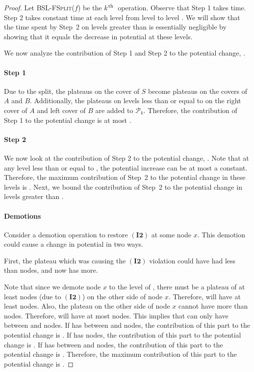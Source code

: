 \documentclass[11pt]{article}
\newcommand{\ens}[1]{\ensuremath{#1}}
\newcommand{\kth}{\ens{k^{ \mbox{\hspace{.2mm}\scriptsize th}}}}
\newcommand{\Bslfsplx}[1]{\mbox{\textsc{BSL-FSplit(\ensuremath{#1})}}}
\newcommand{\invtwo}{\ensuremath{\mathbf{(I2)}}}
\newcommand{\node}[1]{\ensuremath{#1}}
\newcommand{\bsl}[1]{\ensuremath{#1}}
\newcommand{\plats}[1]{\ensuremath{\mathcal P_{#1}}}
\begin{document}
\begin{proof} 
Let \Bslfsplx{f} be the \kth\ operation. Observe that Step 1 takes  time. 
Step 2 takes constant time at each level from level  to level . We will show that the time spent by Step~2 on levels greater than  is essentially negligible by showing that it equals the decrease in potential at these levels. 

We now analyze the contribution of Step 1 and Step 2 to the potential change, . 

\paragraph{Step 1} 


Due to the split, the plateaus on the cover of \bsl S become plateaus on the covers of \bsl A and \bsl B. Additionally, the plateaus on levels less than or equal to  on the right cover of \bsl A and left cover of \bsl B are added to \plats k. 
Therefore, the contribution of Step 1 to the potential change is at most . 

\paragraph{Step 2} 
We now look at the contribution of Step 2 to the potential change, . Note that at any level less than or equal to , the potential increase can be at most a constant. Therefore, the maximum contribution of Step~2 to the potential change in these levels is . Next, we bound the contribution of Step~2 to the potential change in levels greater than . 

\paragraph{Demotions} 
Consider a demotion operation to restore \invtwo{} at some node \node x. This demotion could cause a change in potential in two ways. 

First, the plateau  which was causing the \invtwo{} violation could have had less than  nodes, and now has more. 

Note that since we demote node \node x to the level of , there must be a plateau of at least  nodes (due to \invtwo{}) on the other side of node \node x. Therefore,  will have at least  nodes. Also, the plateau on the other side of node \node x cannot have more than  nodes. Therefore,  will have at most  nodes. This implies that  can only  have between  and  nodes. 
If  has between  and  nodes, the contribution of this part to the potential change is . 
If  has  nodes, the contribution of this part to the potential change is . 
If  has between  and  nodes, the contribution of this part to the potential change is . 
Therefore, the maximum contribution of this part to the potential change is . 



\end{proof}
\end{document}
